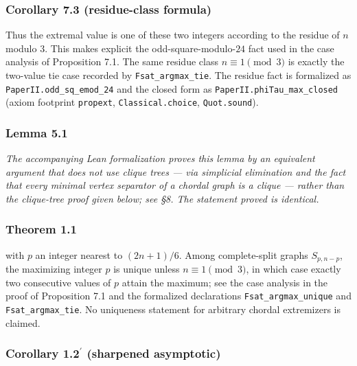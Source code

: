 \documentclass[english,11pt,a4paper]{article}
\begin{document}
\subsubsection{Corollary 7.3 (residue-class
formula)}\label{corollary-7.3-residue-class-formula}

Thus the extremal value is one of these two integers according to the
residue of \(n\) modulo \(3\). This makes explicit the
odd-square-modulo-\(24\) fact used in the case analysis of Proposition
7.1. The same residue class \(n\equiv1\pmod3\) is exactly the two-value
tie case recorded by \nolinkurl{Fsat_argmax_tie}. The residue fact is
formalized as \nolinkurl{PaperII.odd_sq_emod_24} and the closed form as
\nolinkurl{PaperII.phiTau_max_closed} (axiom footprint \nolinkurl{propext},
\nolinkurl{Classical.choice}, \nolinkurl{Quot.sound}).

\subsubsection{Lemma 5.1}\label{lemma-5.1}

\emph{The accompanying Lean formalization proves this lemma by an
equivalent argument that does not use clique trees --- via simplicial
elimination and the fact that every minimal vertex separator of a
chordal graph is a clique --- rather than the clique-tree proof given
below; see §8. The statement proved is identical.}

\subsubsection{Theorem 1.1}\label{theorem-1.1}

with \(p\) an integer nearest to \((2n+1)/6\). Among complete-split
graphs \(S_{p,n-p}\), the maximizing integer \(p\) is unique unless
\(n\equiv1\pmod3\), in which case exactly two consecutive values of
\(p\) attain the maximum; see the case analysis in the proof of
Proposition 7.1 and the formalized declarations
\nolinkurl{Fsat_argmax_unique} and \nolinkurl{Fsat_argmax_tie}. No
uniqueness statement for arbitrary chordal extremizers is claimed.

\subsubsection{\texorpdfstring{Corollary 1.2\(^{\prime}\) (sharpened
asymptotic)}{Corollary 1.2\^{}\{\textbackslash prime\} (sharpened asymptotic)}}\label{corollary-1.2prime-sharpened-asymptotic-1}
\end{document}
